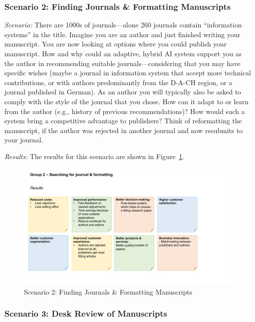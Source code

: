 \subsubsection{Scenario 2: Finding Journals \& Formatting Manuscripts}

\textit{Scenario:}
There are 1000s of journals---alone 260 journals contain “information systems” in the title. Imagine
you are an author and just finished writing your manuscript. You are now looking at options where you
could publish your manuscript. How and why could an adaptive, hybrid AI system support you as the author
in recommending suitable journals---considering that you may have specific wishes (maybe a journal in
information system that accept more technical contributions, or with authors predominantly from the D-A-CH
region, or a journal published in German). As an author you will typically also be asked to comply with the
style of the journal that you chose. How can it adapt to or learn from the author (e.g., history of previous
recommendations)? How would such a system bring a competitive advantage to publishers? Think of reformatting
the manuscript, if the author was rejected in another journal and now resubmits to your journal.

\vspace{0.1cm}
\noindent\textit{Results:} The results for this scenario are shown in Figure~\ref{fig:appendix:fig2}.

\begin{figure}[h!]
    \centering
    \caption{Scenario 2: Finding Journals \& Formatting Manuscripts}
    \label{fig:appendix:fig2}
    \includegraphics[width=\textwidth]{figures/results_2.pdf}
\end{figure}


\subsubsection{Scenario 3: Desk Review of Manuscripts}


